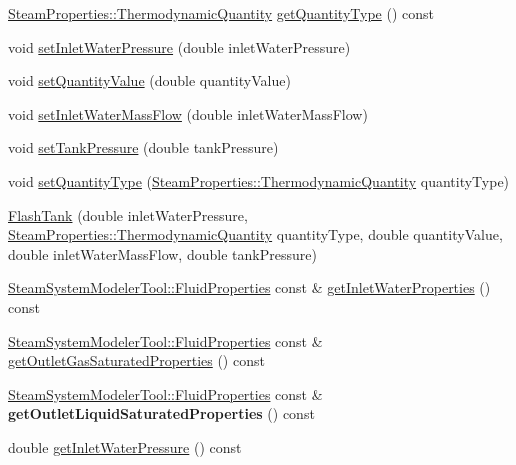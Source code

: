 \begin{DoxyCompactItemize}
\hyperlink{class_steam_properties_ae0294bedf7d178c2d8fb6aed0f62fbff}{Steam\+Properties\+::\+Thermodynamic\+Quantity} \hyperlink{class_flash_tank_a1800317a9b9dd8ff8fb18c693e846a45}{get\+Quantity\+Type} () const
\item 
void \hyperlink{class_flash_tank_aed0991a7902401d110fb2f4b472326f5}{set\+Inlet\+Water\+Pressure} (double inlet\+Water\+Pressure)
\item 
void \hyperlink{class_flash_tank_ac7392743aeaf8de6ce368814ea42e236}{set\+Quantity\+Value} (double quantity\+Value)
\item 
void \hyperlink{class_flash_tank_a2bcbd92d39ef3c760bdd65066ba3d34a}{set\+Inlet\+Water\+Mass\+Flow} (double inlet\+Water\+Mass\+Flow)
\item 
void \hyperlink{class_flash_tank_a8b3bb51a62dac4f76284dfdc114d83fe}{set\+Tank\+Pressure} (double tank\+Pressure)
\item 
void \hyperlink{class_flash_tank_a30aa7a42d1547f61b176da4a15e8e8ee}{set\+Quantity\+Type} (\hyperlink{class_steam_properties_ae0294bedf7d178c2d8fb6aed0f62fbff}{Steam\+Properties\+::\+Thermodynamic\+Quantity} quantity\+Type)
\item 
\hyperlink{class_flash_tank_ad576e26508da35738127a65fd6ddc35d}{Flash\+Tank} (double inlet\+Water\+Pressure, \hyperlink{class_steam_properties_ae0294bedf7d178c2d8fb6aed0f62fbff}{Steam\+Properties\+::\+Thermodynamic\+Quantity} quantity\+Type, double quantity\+Value, double inlet\+Water\+Mass\+Flow, double tank\+Pressure)
\item 
\hyperlink{struct_steam_system_modeler_tool_1_1_fluid_properties}{Steam\+System\+Modeler\+Tool\+::\+Fluid\+Properties} const  \& \hyperlink{class_flash_tank_a582b3e730f1619891533965940d692de}{get\+Inlet\+Water\+Properties} () const
\item 
\hyperlink{struct_steam_system_modeler_tool_1_1_fluid_properties}{Steam\+System\+Modeler\+Tool\+::\+Fluid\+Properties} const  \& \hyperlink{class_flash_tank_a9db00130ed4419e2e251c9e5ce936572}{get\+Outlet\+Gas\+Saturated\+Properties} () const
\item 
\mbox{\label{class_flash_tank_af65a272b08ca55e4e97b3a00c952a6e7}} 
\hyperlink{struct_steam_system_modeler_tool_1_1_fluid_properties}{Steam\+System\+Modeler\+Tool\+::\+Fluid\+Properties} const  \& {\bfseries get\+Outlet\+Liquid\+Saturated\+Properties} () const
\item 
double \hyperlink{class_flash_tank_a62e8ff97d91da0845526c494022e41da}{get\+Inlet\+Water\+Pressure} () const

\end{DoxyCompactItemize}
